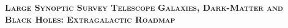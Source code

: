 \documentclass[11pt,headsepline,cleardoubleempty,twoside,openright]{scrbook}
\begin{document}
\begin{titlepage}
\begin{center}

\vspace*{20mm}

{\Huge\bfseries\scshape Large Synoptic Survey Telescope} 
\linebreak 
\linebreak 
{\Huge\bfseries\scshape Galaxies, Dark-Matter and Black Holes: Extragalactic Roadmap} 

\vspace*{20mm}




\vspace*{5mm}


\end{center}
\end{titlepage}




\tableofcontents











%









%
\end{document}
